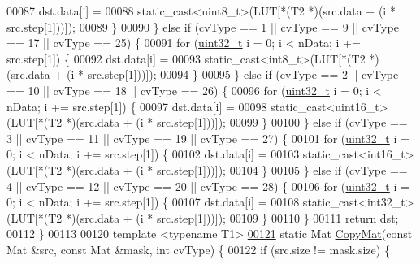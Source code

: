 \begin{DoxyCode}
00087         dst.data[i] =
00088             \textcolor{keyword}{static\_cast<}uint8\_t\textcolor{keyword}{>}(LUT[*(T2 *)(src.data + (i * src.step[1]))]);
00089       \}
00090     \} \textcolor{keywordflow}{else} \textcolor{keywordflow}{if} (cvType == 1 || cvType == 9 || cvType == 17 || cvType == 25) \{
00091       \textcolor{keywordflow}{for} (\hyperlink{_soil_math_types_8h_a435d1572bf3f880d55459d9805097f62}{uint32\_t} i = 0; i < nData; i += src.step[1]) \{
00092         dst.data[i] =
00093             \textcolor{keyword}{static\_cast<}int8\_t\textcolor{keyword}{>}(LUT[*(T2 *)(src.data + (i * src.step[1]))]);
00094       \}
00095     \} \textcolor{keywordflow}{else} \textcolor{keywordflow}{if} (cvType == 2 || cvType == 10 || cvType == 18 || cvType == 26) \{
00096       \textcolor{keywordflow}{for} (\hyperlink{_soil_math_types_8h_a435d1572bf3f880d55459d9805097f62}{uint32\_t} i = 0; i < nData; i += src.step[1]) \{
00097         dst.data[i] =
00098             \textcolor{keyword}{static\_cast<}uint16\_t\textcolor{keyword}{>}(LUT[*(T2 *)(src.data + (i * src.step[1]))]);
00099       \}
00100     \} \textcolor{keywordflow}{else} \textcolor{keywordflow}{if} (cvType == 3 || cvType == 11 || cvType == 19 || cvType == 27) \{
00101       \textcolor{keywordflow}{for} (\hyperlink{_soil_math_types_8h_a435d1572bf3f880d55459d9805097f62}{uint32\_t} i = 0; i < nData; i += src.step[1]) \{
00102         dst.data[i] =
00103             \textcolor{keyword}{static\_cast<}int16\_t\textcolor{keyword}{>}(LUT[*(T2 *)(src.data + (i * src.step[1]))]);
00104       \}
00105     \} \textcolor{keywordflow}{else} \textcolor{keywordflow}{if} (cvType == 4 || cvType == 12 || cvType == 20 || cvType == 28) \{
00106       \textcolor{keywordflow}{for} (\hyperlink{_soil_math_types_8h_a435d1572bf3f880d55459d9805097f62}{uint32\_t} i = 0; i < nData; i += src.step[1]) \{
00107         dst.data[i] =
00108             \textcolor{keyword}{static\_cast<}int32\_t\textcolor{keyword}{>}(LUT[*(T2 *)(src.data + (i * src.step[1]))]);
00109       \}
00110     \}
00111     \textcolor{keywordflow}{return} dst;
00112   \}
00113 
00120   \textcolor{keyword}{template} <\textcolor{keyword}{typename} T1>
\hypertarget{_image_processing_8h_source_l00121}{}\hyperlink{class_vision_1_1_image_processing_a5a255d7f5b10bcb199e66d1e00ab9d1a}{00121}   \textcolor{keyword}{static} Mat \hyperlink{class_vision_1_1_image_processing_a5a255d7f5b10bcb199e66d1e00ab9d1a}{CopyMat}(\textcolor{keyword}{const} Mat &src, \textcolor{keyword}{const} Mat &mask, \textcolor{keywordtype}{int} cvType) \{
00122     \textcolor{keywordflow}{if} (src.size != mask.size) \{

\end{DoxyCode}
